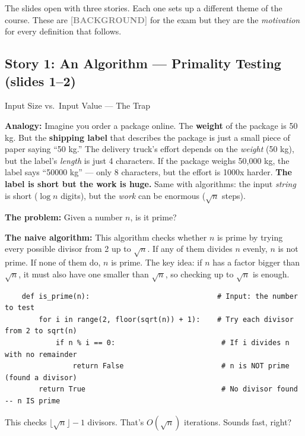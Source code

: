 \documentclass[11pt,a4paper]{article}
\newcommand{\kbg}{\textcolor{gray}{\textbf{[BACKGROUND]}}}
\begin{document}
The slides open with three stories. Each one sets up a different theme of the course. These are \kbg{} for the exam but they are the \textit{motivation} for every definition that follows.

\subsection{Story 1: An Algorithm --- Primality Testing (slides 1--2)}

\begin{conceptbox}{Input Size vs.\ Input Value --- The Trap}

\textbf{Analogy:} Imagine you order a package online. The \textbf{weight} of the package is 50 kg. But the \textbf{shipping label} that describes the package is just a small piece of paper saying ``50 kg.'' The delivery truck's effort depends on the \textit{weight} (50 kg), but the label's \textit{length} is just 4 characters. If the package weighs 50,000 kg, the label says ``50000 kg'' --- only 8 characters, but the effort is 1000x harder. \textbf{The label is short but the work is huge.} Same with algorithms: the input \textit{string} is short ($\log n$ digits), but the \textit{work} can be enormous ($\sqrt{n}$ steps).

\textbf{The problem:} Given a number $n$, is it prime?

\textbf{The naive algorithm:} This algorithm checks whether $n$ is prime by trying every possible divisor from 2 up to $\sqrt{n}$. If any of them divides $n$ evenly, $n$ is not prime. If none of them do, $n$ is prime. The key idea: if $n$ has a factor bigger than $\sqrt{n}$, it must also have one smaller than $\sqrt{n}$, so checking up to $\sqrt{n}$ is enough.

\begin{lstlisting}
    def is_prime(n):                              # Input: the number to test
        for i in range(2, floor(sqrt(n)) + 1):    # Try each divisor from 2 to sqrt(n)
            if n % i == 0:                         # If i divides n with no remainder
                return False                       # n is NOT prime (found a divisor)
        return True                                # No divisor found -- n IS prime
\end{lstlisting}

This checks $\lfloor\sqrt{n}\rfloor - 1$ divisors. That's $O(\sqrt{n})$ iterations. Sounds fast, right?


\end{conceptbox}
\end{document}
